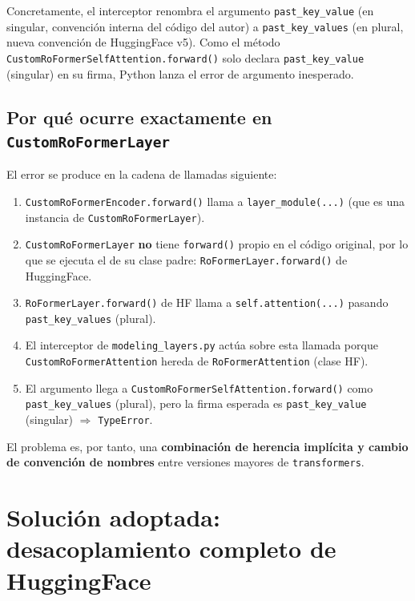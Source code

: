 \documentclass[12pt,a4paper]{article}
\begin{document}
Concretamente, el interceptor renombra el argumento \texttt{past\_key\_value}
(en singular, convención interna del código del autor) a \texttt{past\_key\_values}
(en plural, nueva convención de HuggingFace v5). Como el método
\texttt{CustomRoFormerSelfAttention.forward()} solo declara \texttt{past\_key\_value}
(singular) en su firma, Python lanza el error de argumento inesperado.

\subsection{Por qué ocurre exactamente en \texttt{CustomRoFormerLayer}}

El error se produce en la cadena de llamadas siguiente:

\begin{enumerate}
  \item \texttt{CustomRoFormerEncoder.forward()} llama a \texttt{layer\_module(...)}
        (que es una instancia de \texttt{CustomRoFormerLayer}).
  \item \texttt{CustomRoFormerLayer} \textbf{no} tiene \texttt{forward()} propio en el
        código original, por lo que se ejecuta el de su clase padre:
        \texttt{RoFormerLayer.forward()} de HuggingFace.
  \item \texttt{RoFormerLayer.forward()} de HF llama a \texttt{self.attention(...)}
        pasando \texttt{past\_key\_values} (plural).
  \item El interceptor de \texttt{modeling\_layers.py} actúa sobre esta llamada porque
        \texttt{CustomRoFormerAttention} hereda de \texttt{RoFormerAttention} (clase HF).
  \item El argumento llega a \texttt{CustomRoFormerSelfAttention.forward()} como
        \texttt{past\_key\_values} (plural), pero la firma esperada es
        \texttt{past\_key\_value} (singular) $\Rightarrow$ \texttt{TypeError}.
\end{enumerate}

El problema es, por tanto, una \textbf{combinación de herencia implícita y cambio de
convención de nombres} entre versiones mayores de \texttt{transformers}.

\section{Solución adoptada: desacoplamiento completo de HuggingFace}
\end{document}
